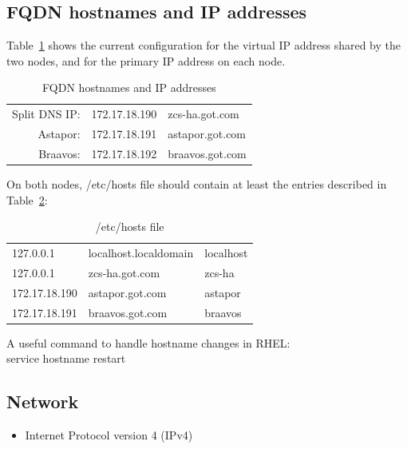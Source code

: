 \documentclass[a4paper, 12pt]{book}
\begin{document}
\subsection{FQDN hostnames and IP addresses}
\label{sec:fqdn}

Table~\ref{table:fqdn} shows the current configuration for the virtual IP address shared by the two nodes, and for the primary IP address on each node.

\FloatBarrier
\begin{table}[H]
  \centering
  \begin{tabular}{ | r c l | }
    \hline    
    Split DNS IP: & 172.17.18.190 & zcs-ha.got.com \\
	Astapor:      & 172.17.18.191 & astapor.got.com \\
	Braavos:      & 172.17.18.192 & braavos.got.com \\
    \hline
  \end{tabular}
\caption{FQDN hostnames and IP addresses}
\label{table:fqdn}
\end{table}

\noindent On both nodes, /etc/hosts file should contain at least the entries described in Table~\ref{table:hosts}:

\FloatBarrier
\begin{table}[H]
  \centering
  \begin{tabular}{ | l l l | }
    \hline    
    127.0.0.1     & localhost.localdomain & localhost \\
    127.0.0.1     & zcs-ha.got.com        & zcs-ha\\
	172.17.18.190 & astapor.got.com       & astapor\\
	172.17.18.191 & braavos.got.com       & braavos\\
    \hline
  \end{tabular}
\caption{/etc/hosts file}
\label{table:hosts}
\end{table}

\noindent A useful command to handle hostname changes in RHEL:\\
\indent service hostname restart\bigskip


\subsection{Network}
\label{sec:network}

\begin{itemize}[leftmargin=*]
	\item Internet Protocol version 4 (IPv4)
\end{itemize}
\end{document}
